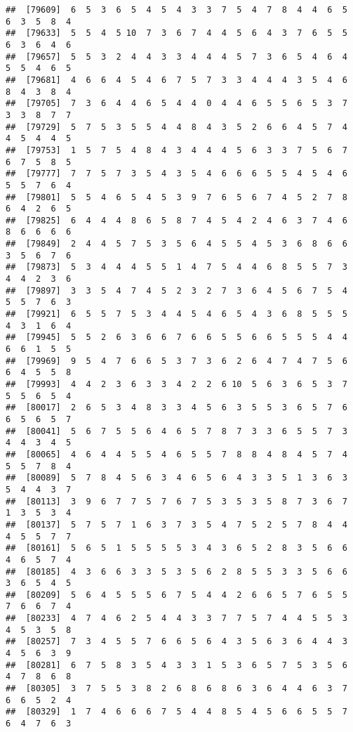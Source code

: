 \documentclass[
]{book}
\begin{document}
\begin{verbatim}
##  [79609]  6  5  3  6  5  4  5  4  3  3  7  5  4  7  8  4  4  6  5  6  3  5  8  4
##  [79633]  5  5  4  5 10  7  3  6  7  4  4  5  6  4  3  7  6  5  5  6  3  6  4  6
##  [79657]  5  5  3  2  4  4  3  3  4  4  4  5  7  3  6  5  4  6  4  5  5  4  6  5
##  [79681]  4  6  6  4  5  4  6  7  5  7  3  3  4  4  4  3  5  4  6  8  4  3  8  4
##  [79705]  7  3  6  4  4  6  5  4  4  0  4  4  6  5  5  6  5  3  7  3  3  8  7  7
##  [79729]  5  7  5  3  5  5  4  4  8  4  3  5  2  6  6  4  5  7  4  4  5  4  4  5
##  [79753]  1  5  7  5  4  8  4  3  4  4  4  5  6  3  3  7  5  6  7  6  7  5  8  5
##  [79777]  7  7  5  7  3  5  4  3  5  4  6  6  6  5  5  4  5  4  6  5  5  7  6  4
##  [79801]  5  5  4  6  5  4  5  3  9  7  6  5  6  7  4  5  2  7  8  6  4  2  6  5
##  [79825]  6  4  4  4  8  6  5  8  7  4  5  4  2  4  6  3  7  4  6  8  6  6  6  6
##  [79849]  2  4  4  5  7  5  3  5  6  4  5  5  4  5  3  6  8  6  6  3  5  6  7  6
##  [79873]  5  3  4  4  4  5  5  1  4  7  5  4  4  6  8  5  5  7  3  4  4  2  3  6
##  [79897]  3  3  5  4  7  4  5  2  3  2  7  3  6  4  5  6  7  5  4  5  5  7  6  3
##  [79921]  6  5  5  7  5  3  4  4  5  4  6  5  4  3  6  8  5  5  5  4  3  1  6  4
##  [79945]  5  5  2  6  3  6  6  7  6  6  5  5  6  6  5  5  5  4  4  6  6  1  5  5
##  [79969]  9  5  4  7  6  6  5  3  7  3  6  2  6  4  7  4  7  5  6  6  4  5  5  8
##  [79993]  4  4  2  3  6  3  3  4  2  2  6 10  5  6  3  6  5  3  7  5  5  6  5  4
##  [80017]  2  6  5  3  4  8  3  3  4  5  6  3  5  5  3  6  5  7  6  6  5  6  5  7
##  [80041]  5  6  7  5  5  6  4  6  5  7  8  7  3  3  6  5  5  7  3  4  4  3  4  5
##  [80065]  4  6  4  4  5  5  4  6  5  5  7  8  8  4  8  4  5  7  4  5  5  7  8  4
##  [80089]  5  7  8  4  5  6  3  4  6  5  6  4  3  3  5  1  3  6  3  5  4  4  3  7
##  [80113]  3  9  6  7  7  5  7  6  7  5  3  5  3  5  8  7  3  6  7  1  3  5  3  4
##  [80137]  5  7  5  7  1  6  3  7  3  5  4  7  5  2  5  7  8  4  4  4  5  5  7  7
##  [80161]  5  6  5  1  5  5  5  5  3  4  3  6  5  2  8  3  5  6  6  4  6  5  7  4
##  [80185]  4  3  6  6  3  3  5  3  5  6  2  8  5  5  3  3  5  6  6  3  6  5  4  5
##  [80209]  5  6  4  5  5  5  6  7  5  4  4  2  6  6  5  7  6  5  5  7  6  6  7  4
##  [80233]  4  7  4  6  2  5  4  4  3  3  7  7  5  7  4  4  5  5  3  4  5  3  5  8
##  [80257]  7  3  4  5  5  7  6  6  5  6  4  3  5  6  3  6  4  4  3  4  5  6  3  9
##  [80281]  6  7  5  8  3  5  4  3  3  1  5  3  6  5  7  5  3  5  6  4  7  8  6  8
##  [80305]  3  7  5  5  3  8  2  6  8  6  8  6  3  6  4  4  6  3  7  6  6  5  2  4
##  [80329]  1  7  4  6  6  6  7  5  4  4  8  5  4  5  6  6  5  5  7  6  4  7  6  3

\end{verbatim}
\end{document}

